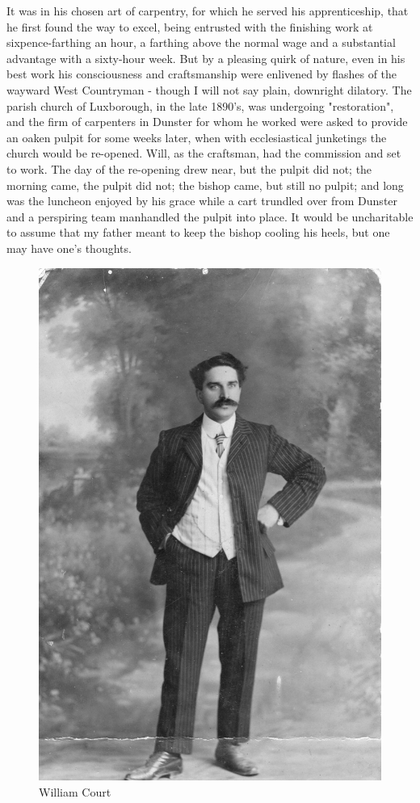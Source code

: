 It was in his chosen art of carpentry, for which he served his apprenticeship, that he first found the way to excel, being entrusted with the finishing work at sixpence-farthing an hour, a farthing above the normal wage and a substantial advantage with a sixty-hour week. But by a pleasing quirk of nature, even in his best work his consciousness and craftsmanship were enlivened by flashes of the wayward West Countryman - though I will not say plain, downright dilatory. The parish church of Luxborough, in the late 1890's, was undergoing "restoration", and the firm of carpenters in Dunster for whom he worked were asked to provide an oaken pulpit for some weeks later, when with ecclesiastical junketings the church would be re-opened. Will, as the craftsman, had the commission and set to work. The day of the re-opening drew near, but the pulpit did not; the morning came, the pulpit did not; the bishop came, but still no pulpit; and long was the luncheon enjoyed by his grace while a cart trundled over from Dunster and a perspiring team manhandled the pulpit into place. It would be uncharitable to assume that my father meant to keep the bishop cooling his heels, but one may have one’s thoughts.

\begin{figure}
	\centering
     \includegraphics[width=1\textwidth]{figures/WilliamCourt}
     \caption{William Court}
     \label{fig:WilliamCourt}
\end{figure}

